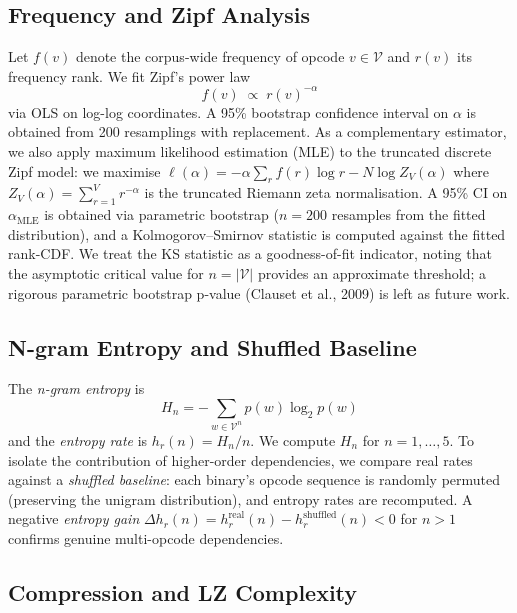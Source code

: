 \documentclass[10pt,twocolumn]{article}
\begin{document}
\subsection{Frequency and Zipf Analysis}

Let $f(v)$ denote the corpus-wide frequency of opcode $v \in \mathcal{V}$ and
$r(v)$ its frequency rank.  We fit Zipf's power law
\begin{equation}
  f(v) \;\propto\; r(v)^{-\alpha}
  \label{eq:zipf}
\end{equation}
via OLS on log-log coordinates.  A 95\% bootstrap confidence interval on
$\alpha$ is obtained from 200 resamplings with replacement.  As a
complementary estimator, we also apply maximum likelihood estimation (MLE)
to the truncated discrete Zipf model: we maximise
$\ell(\alpha) = -\alpha \sum_r f(r)\log r - N \log Z_V(\alpha)$
where $Z_V(\alpha) = \sum_{r=1}^{V} r^{-\alpha}$ is the truncated Riemann
zeta normalisation.  A 95\% CI on $\alpha_{\text{MLE}}$ is obtained via
parametric bootstrap ($n=200$ resamples from the fitted distribution), and
a Kolmogorov--Smirnov statistic is computed against the fitted rank-CDF.
We treat the KS statistic as a goodness-of-fit indicator, noting that the
asymptotic critical value for $n = |\mathcal{V}|$ provides an approximate
threshold; a rigorous parametric bootstrap p-value (Clauset et al., 2009)
is left as future work.

\subsection{N-gram Entropy and Shuffled Baseline}

The \emph{n-gram entropy} is
\begin{equation}
  H_n = -\sum_{w \in \mathcal{V}^n} p(w) \log_2 p(w)
\end{equation}
and the \emph{entropy rate} is $h_r(n) = H_n / n$.  We compute $H_n$ for
$n = 1,\ldots,5$.  To isolate the contribution of higher-order dependencies, we
compare real rates against a \emph{shuffled baseline}: each binary's opcode
sequence is randomly permuted (preserving the unigram distribution), and entropy
rates are recomputed.  A negative \emph{entropy gain}
$\Delta h_r(n) = h_r^{\text{real}}(n) - h_r^{\text{shuffled}}(n) < 0$
for $n > 1$ confirms genuine multi-opcode dependencies.

\subsection{Compression and LZ Complexity}
\end{document}
